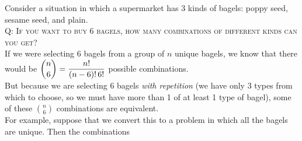 \documentclass{article}
\begin{document}
Consider a situation in which a supermarket has 3 kinds of bagels: poppy seed, sesame seed, and plain.\\[1ex]
\textsc{Q: If you want to buy 6 bagels, how many combinations of different kinds can you get?}\\[1ex]
If we were selecting 6 bagels from a group of $n$ unique bagels, we know that there would be $\dbinom{n}{6}=\dfrac{n!}{(n-6)!\,6!}$ possible combinations.\\[1ex]
But because we are selecting 6 bagels \textit{with repetition} (we have only 3 types from which to choose, so we must have more than 1 of at least 1 type of bagel), some of these $\binom{n}{6}$ combinations are equivalent.\\[1ex]
For example, suppose that we convert this to a problem in which all the bagels are unique. Then the combinations
\end{document}
